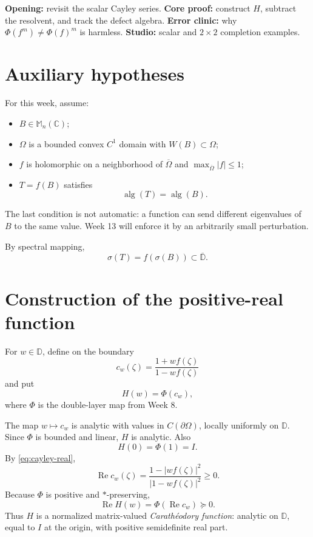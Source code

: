 \documentclass[11pt,oneside,openany]{book}
\theoremstyle{definition}
\theoremstyle{remark}
\newcommand{\C}{\mathbb C}
\newcommand{\D}{\mathbb D}
\newcommand{\Mn}{\mathbb M_n(\C)}
\newcommand{\alg}{\operatorname{alg}}
\newcommand{\RePart}{\operatorname{Re}}
\newcommand{\spec}{\sigma}
\newcommand{\olD}{\overline{\D}}
\begin{document}
\begin{workshopplan}
\textbf{Opening:} revisit the scalar Cayley series.
\textbf{Core proof:} construct \(H\), subtract the resolvent, and
track the defect algebra.
\textbf{Error clinic:} why \(\Phi(f^m)\neq\Phi(f)^m\) is harmless.
\textbf{Studio:} scalar and \(2\times2\) completion examples.
\end{workshopplan}

\section{Auxiliary hypotheses}

For this week, assume:
\begin{itemize}
  \item \(B\in\Mn\);
  \item \(\Omega\) is a bounded convex \(C^1\) domain with
  \(W(B)\subset\Omega\);
  \item \(f\) is holomorphic on a neighborhood of
  \(\overline\Omega\) and
  \(\max_{\overline\Omega}|f|\leq1\);
  \item \(T=f(B)\) satisfies
  \begin{equation}
    \alg(T)=\alg(B).
    \label{eq:alg-generation}
  \end{equation}
\end{itemize}
The last condition is not automatic: a function can send different
eigenvalues of \(B\) to the same value.  Week 13 will enforce it by an
arbitrarily small perturbation.

By spectral mapping,
\[
  \spec(T)=f(\spec(B))\subset\olD.
\]

\section{Construction of the positive-real function}

For \(w\in\D\), define on the boundary
\begin{equation}
  c_w(\zeta)=\frac{1+wf(\zeta)}{1-wf(\zeta)}
  \label{eq:cayley-boundary}
\end{equation}
and put
\begin{equation}
  H(w)=\Phi(c_w),
  \label{eq:H-Phi}
\end{equation}
where \(\Phi\) is the double-layer map from Week 8.

The map \(w\mapsto c_w\) is analytic with values in
\(C(\partial\Omega)\), locally uniformly on \(\D\).  Since \(\Phi\)
is bounded and linear, \(H\) is analytic.  Also
\[
  H(0)=\Phi(1)=I.
\]
By \eqref{eq:cayley-real},
\[
  \RePart c_w(\zeta)
  =\frac{1-|wf(\zeta)|^2}{|1-wf(\zeta)|^2}\geq0.
\]
Because \(\Phi\) is positive and \(*\)-preserving,
\begin{equation}
  \RePart H(w)
  =\Phi(\RePart c_w)\succeq0.
  \label{eq:H-positive}
\end{equation}
Thus \(H\) is a normalized matrix-valued
\emph{Carath\'eodory function}: analytic on \(\D\), equal to \(I\) at
the origin, with positive semidefinite real part.
\end{document}

